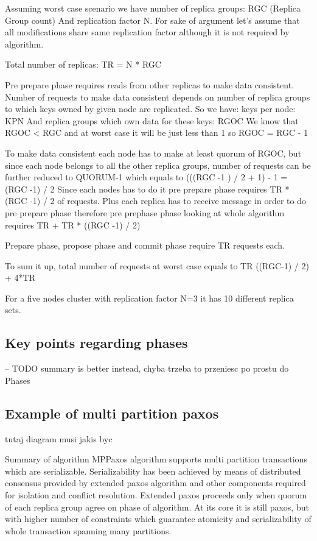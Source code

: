 Assuming worst case scenario we have number of replica groups: RGC (Replica Group count)
And replication factor N. For sake of argument let’s assume that all modifications share same replication factor although it is not required by algorithm.


Total number of replicas: TR = N * RGC


Pre prepare phase requires reads from other replicas to make data consistent. Number of requests to make data consistent depends on number of replica groups to which keys owned by given node are replicated. So we have:
keys per node: KPN
And replica groups which own data for these keys: RGOC
We know that RGOC < RGC and at worst case it will be just less than 1 so RGOC = RGC - 1


To make data consistent each node has to make at least quorum of RGOC, but since each node belongs to all the other replica groups, number of requests can be further reduced to QUORUM-1 which equals to (((RGC -1 ) / 2 + 1) - 1 = (RGC -1) / 2
Since each nodes has to do it pre prepare phase requires TR * (RGC -1) / 2 of requests. Plus each replica has to receive message in order to do pre prepare phase therefore pre prephase phase looking at whole algorithm requires TR + TR * ((RGC -1) / 2) 


Prepare phase, propose phase and commit phase require TR requests each.


To sum it up, total number of requests at worst case equals to 
TR ((RGC-1) / 2) + 4*TR


For a five nodes cluster with replication factor N=3 it has
10 different replica sets.




\subsection{Key points regarding phases} 
-- TODO summary is better instead, chyba trzeba to przeniesc po prostu do Phases


\subsection{Example of multi partition paxos}
tutaj diagram musi jakis byc




Summary of algorithm
MPPaxos algorithm supports multi partition transactions which are serializable. Serializability has been achieved by means of distributed consensus provided by extended paxos algorithm and other components required for isolation and conflict resolution. Extended paxos proceeds only when quorum of each replica group agree on phase of algorithm. At its core it is still paxos, but with higher number of constraints which guarantee atomicity and serializability of whole transaction spanning many partitions.